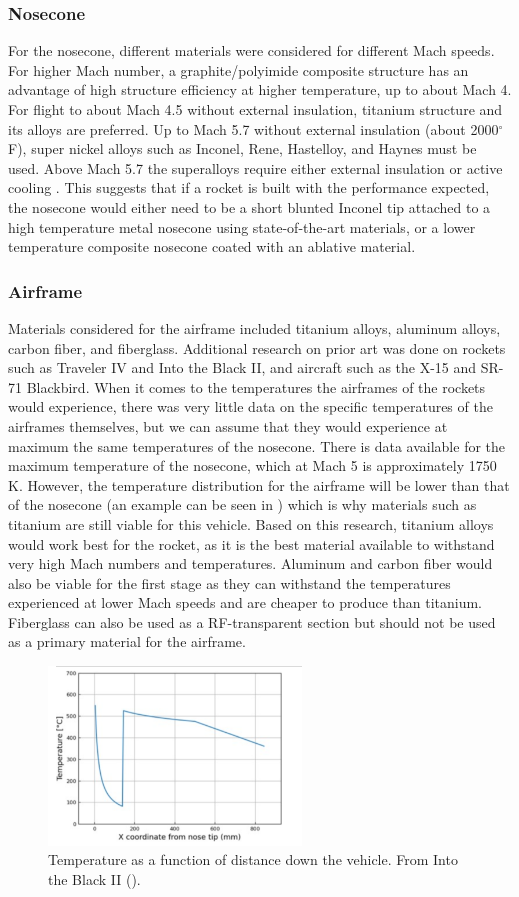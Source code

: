 \subsubsection{Nosecone}
For the nosecone, different materials were considered for different Mach speeds. For higher Mach number, a graphite/polyimide composite structure has an advantage of high structure efficiency at higher temperature, up to about Mach 4. For flight to about Mach 4.5 without external insulation, titanium structure and its alloys are preferred. Up to Mach 5.7 without external insulation (about 2000\(^\circ\)F), super nickel alloys such as Inconel, Rene, Hastelloy, and Haynes must be used. Above Mach 5.7 the superalloys require either external insulation or active cooling \cite{sugarshot}. This suggests that if a rocket is built with the performance expected, the nosecone would either need to be a short blunted Inconel tip attached to a high temperature metal nosecone using state-of-the-art materials, or a lower temperature composite nosecone coated with an ablative material.

\subsubsection{Airframe}
Materials considered for the airframe included titanium alloys, aluminum alloys, carbon fiber, and fiberglass. Additional research on prior art was done on rockets such as Traveler IV and Into the Black II, and aircraft such as the X-15 and SR-71 Blackbird. When it comes to the temperatures the airframes of the rockets would experience, there was very little data on the specific temperatures of the airframes themselves, but we can assume that they would experience at maximum the same temperatures of the nosecone. There is data available for the maximum temperature of the nosecone, which at Mach 5 is approximately 1750 K. However, the temperature distribution for the airframe will be lower than that of the nosecone (an example can be seen in ) which is why materials such as titanium are still viable for this vehicle. Based on this research, titanium alloys would work best for the rocket, as it is the best material available to withstand very high Mach numbers and temperatures. Aluminum and carbon fiber would also be viable for the first stage as they can withstand the temperatures experienced at lower Mach speeds and are cheaper to produce than titanium. Fiberglass can also be used as a RF-transparent section but should not be used as a primary material for the airframe.

\begin{figure}
    \centering
    \includegraphics[width=0.6\textwidth]{images/temp-vs-x}
    \caption{Temperature as a function of distance down the vehicle. From Into the Black II (\cite{into-black}).}
    \label{figure:temp-vs-x}
\end{figure}
